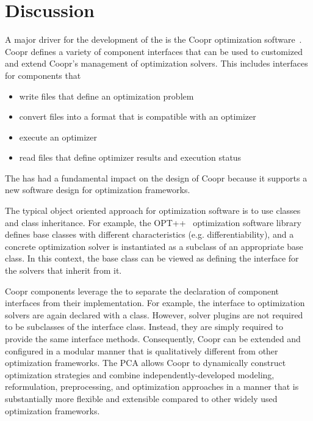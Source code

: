 
\section{Discussion}

\label{chap:disc}

A major driver for the development of the \pcasp is the Coopr optimization software~\cite{Coopr}. 
Coopr defines a variety of component interfaces that can be used to
customized and extend Coopr's management of optimization solvers.  This includes interfaces for components that 
\begin{itemize}
\item write files that define an optimization problem
\item convert files into a format that is compatible with an optimizer
\item execute an optimizer
\item read files that define optimizer results and execution status
\end{itemize}
The \pcasp has had a fundamental impact on the design of Coopr because it
supports a new software design for optimization frameworks.

The typical object oriented approach for optimization software is
to use classes and class inheritance.  For example, the OPT++~\cite{Mez94}
optimization software library defines base classes with different
characteristics (e.g. differentiability), and a concrete optimization
solver is instantiated as a subclass of an appropriate base class.  In this
context, the base class can be viewed as defining the interface for the 
solvers that inherit from it.

Coopr components leverage the \pcasp to separate the declaration
of component interfaces from their implementation.  For example,
the interface to optimization solvers are again declared with a class.
However, solver plugins are not required to be subclasses of the interface
class.  Instead, they are simply required to provide the same interface
methods.  Consequently, Coopr can be extended and configured in a modular
manner that is qualitatively different from other optimization frameworks.
The PCA allows Coopr to dynamically construct optimization strategies and
combine independently-developed modeling, reformulation, preprocessing,
and optimization approaches in a manner that is substantially more
flexible and extensible compared to other widely used optimization
frameworks.

